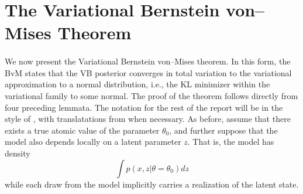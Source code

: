 

\section{The Variational Bernstein von--Mises Theorem}

\paragraph{} We now present the Variational Bernstein von--Mises theorem. In this form, the BvM states that the VB posterior converges in total variation to the variational approximation to a normal distribution, i.e., the KL minimizer within the variational family to some normal. The proof of the theorem follows directly from four preceding lemmata. The notation for the rest of the report will be in the style of \cite{Wang:2019:VBVM}, with translatations from \cite{Asymptotics:2000} when necessary. As before, assume that there exists a true atomic value of the parameter $\theta_0$, and further suppose that the model also depends locally on a latent parameter $z$. That is, the model has density
\begin{equation}
\label{model}
\int p(x, z|\theta = \theta_0)dz 
\end{equation}
while each draw from the model implicitly carries a realization of the latent state. 

